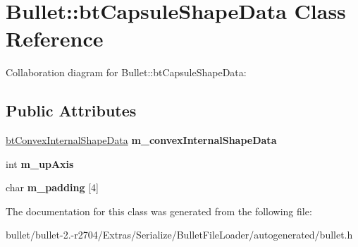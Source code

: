 \hypertarget{class_bullet_1_1bt_capsule_shape_data}{\section{Bullet\+:\+:bt\+Capsule\+Shape\+Data Class Reference}
\label{class_bullet_1_1bt_capsule_shape_data}
}


Collaboration diagram for Bullet\+:\+:bt\+Capsule\+Shape\+Data\+:
\subsection*{Public Attributes}
\begin{DoxyCompactItemize}
\item 
\hypertarget{class_bullet_1_1bt_capsule_shape_data_acf162cb4f3e5bc73a1e0793ca827d3b4}{\hyperlink{class_bullet_1_1bt_convex_internal_shape_data}{bt\+Convex\+Internal\+Shape\+Data} {\bfseries m\+\_\+convex\+Internal\+Shape\+Data}}\label{class_bullet_1_1bt_capsule_shape_data_acf162cb4f3e5bc73a1e0793ca827d3b4}

\item 
\hypertarget{class_bullet_1_1bt_capsule_shape_data_a5acceb258ce2897d77c120c10b8dfa18}{int {\bfseries m\+\_\+up\+Axis}}\label{class_bullet_1_1bt_capsule_shape_data_a5acceb258ce2897d77c120c10b8dfa18}

\item 
\hypertarget{class_bullet_1_1bt_capsule_shape_data_a8dacd94df958ce27c5341fd41b6813ae}{char {\bfseries m\+\_\+padding} \mbox{[}4\mbox{]}}\label{class_bullet_1_1bt_capsule_shape_data_a8dacd94df958ce27c5341fd41b6813ae}

\end{DoxyCompactItemize}


The documentation for this class was generated from the following file\+:\begin{DoxyCompactItemize}
\item 
bullet/bullet-\/2.-\/r2704/\+Extras/\+Serialize/\+Bullet\+File\+Loader/autogenerated/bullet.\+h\end{DoxyCompactItemize}
